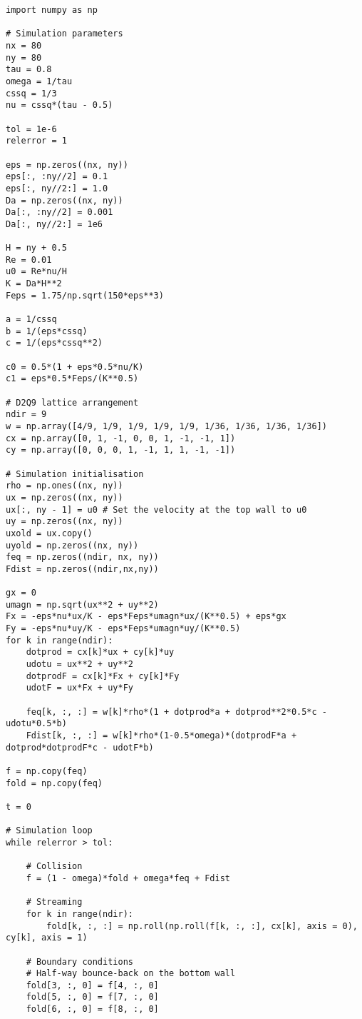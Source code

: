 \begin{mdframed}[backgroundcolor=red!10, linecolor=red!10]
\begin{verbatim}
import numpy as np

# Simulation parameters
nx = 80
ny = 80
tau = 0.8
omega = 1/tau
cssq = 1/3
nu = cssq*(tau - 0.5)

tol = 1e-6
relerror = 1

eps = np.zeros((nx, ny))
eps[:, :ny//2] = 0.1
eps[:, ny//2:] = 1.0
Da = np.zeros((nx, ny))
Da[:, :ny//2] = 0.001
Da[:, ny//2:] = 1e6

H = ny + 0.5
Re = 0.01
u0 = Re*nu/H
K = Da*H**2 
Feps = 1.75/np.sqrt(150*eps**3)

a = 1/cssq
b = 1/(eps*cssq)
c = 1/(eps*cssq**2)

c0 = 0.5*(1 + eps*0.5*nu/K)
c1 = eps*0.5*Feps/(K**0.5)

# D2Q9 lattice arrangement
ndir = 9
w = np.array([4/9, 1/9, 1/9, 1/9, 1/9, 1/36, 1/36, 1/36, 1/36])
cx = np.array([0, 1, -1, 0, 0, 1, -1, -1, 1])
cy = np.array([0, 0, 0, 1, -1, 1, 1, -1, -1])

# Simulation initialisation
rho = np.ones((nx, ny))
ux = np.zeros((nx, ny))
ux[:, ny - 1] = u0 # Set the velocity at the top wall to u0
uy = np.zeros((nx, ny))
uxold = ux.copy()
uyold = np.zeros((nx, ny))
feq = np.zeros((ndir, nx, ny))
Fdist = np.zeros((ndir,nx,ny))

gx = 0
umagn = np.sqrt(ux**2 + uy**2)
Fx = -eps*nu*ux/K - eps*Feps*umagn*ux/(K**0.5) + eps*gx
Fy = -eps*nu*uy/K - eps*Feps*umagn*uy/(K**0.5) 
for k in range(ndir):
    dotprod = cx[k]*ux + cy[k]*uy
    udotu = ux**2 + uy**2
    dotprodF = cx[k]*Fx + cy[k]*Fy
    udotF = ux*Fx + uy*Fy

    feq[k, :, :] = w[k]*rho*(1 + dotprod*a + dotprod**2*0.5*c - udotu*0.5*b)
    Fdist[k, :, :] = w[k]*rho*(1-0.5*omega)*(dotprodF*a + dotprod*dotprodF*c - udotF*b) 

f = np.copy(feq)
fold = np.copy(feq)

t = 0

# Simulation loop
while relerror > tol:

    # Collision
    f = (1 - omega)*fold + omega*feq + Fdist

    # Streaming
    for k in range(ndir):
        fold[k, :, :] = np.roll(np.roll(f[k, :, :], cx[k], axis = 0), cy[k], axis = 1)

    # Boundary conditions
    # Half-way bounce-back on the bottom wall
    fold[3, :, 0] = f[4, :, 0]
    fold[5, :, 0] = f[7, :, 0]
    fold[6, :, 0] = f[8, :, 0]
    

\end{verbatim}
\end{mdframed}
